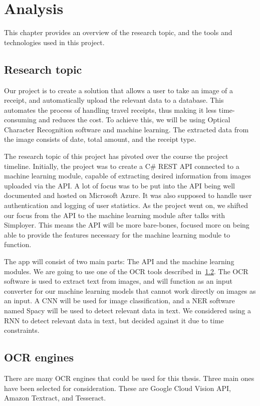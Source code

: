 \cleardoublepage
\chapter{Analysis}
\label{ch:analysis}
This chapter provides an overview of the research topic, and the tools and technologies used in this project.

\section{Research topic}\label{sec:research-topic}
Our project is to create a solution that allows a user to take an image of a receipt, and automatically upload the
relevant data to a database.
This automates the process of handling travel receipts, thus making it less time-consuming and reduces the cost.
To achieve this, we will be using Optical Character Recognition software and machine learning\@.
The extracted data from the image consists of date, total amount, and the receipt type.

The research topic of this project has pivoted over the course the project timeline.
Initially, the project was to create a C\# REST API connected to a machine learning module, capable of extracting desired information from images uploaded via the API.
A lot of focus was to be put into the API being well documented and hosted on Microsoft Azure.
It was also supposed to handle user authentication and logging of user statistics.
As the project went on, we shifted our focus from the API to the machine learning module after talks with Simployer.
This means the API will be more bare-bones, focused more on being able to provide the features necessary for the machine learning module to function.

The app will consist of two main parts: The API and the machine learning modules.
We are going to use one of the OCR tools described in~\ref{sec:ocr-engines}.
The OCR software is used to extract text from images, and will function as an input converter for our machine learning models that cannot work directly on images as an input.
A CNN will be used for image classification, and a NER software named Spacy will be used to detect relevant data in text.
We considered using a RNN to detect relevant data in text, but decided against it due to time constraints.

\section{OCR engines}\label{sec:ocr-engines}
There are many OCR engines that could be used for this thesis.
Three main ones have been selected for consideration.
These are Google Cloud Vision API, Amazon Textract, and Tesseract.
